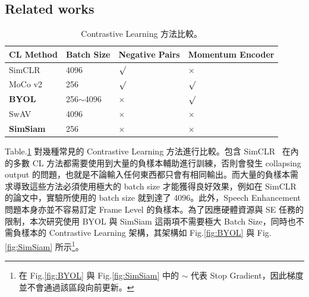 \documentclass[10pt,twocolumn,letterpaper]{article}
\begin{document}
\begin{CJK}{UTF8}{bkai}
   \section{Related works}
   \begin{table}
      \caption{Contrastive Learning 方法比較。\label{table:CL-methods}}
      \begin{center}
         \begin{tabular}{ m{1.7cm} m{1.7cm} m{1.7cm} m{1.7cm} }
            CL Method        & Batch Size    & Negative Pairs     & Momentum Encoder \\
            \hline
            SimCLR           & 4096          & $\surd$            & $\times$         \\
            \hline
            MoCo v2          & 256           & $\surd$            & $\surd$          \\
            \hline
            \textbf{BYOL}    & 256$\sim$4096 & \textbf{$\times$}  & $\surd$          \\
            \hline
            SwAV             & 4096          & $\times$           & $\times$         \\
            \hline
            \textbf{SimSiam} & 256           & \textbf{$\times$ } & $\times$         \\
            \hline
         \end{tabular}
      \end{center}
   \end{table}
   Table.\ref{table:CL-methods} 對幾種常見的 Contrastive Learning 方法進行比較。包含 SimCLR~\cite{SimCLR} 在內的多數
   CL 方法都需要使用到大量的負樣本輔助進行訓練，否則會發生 collapsing output
   的問題，也就是不論輸入任何東西都只會有相同輸出。而大量的負樣本需求導致這些方法必須使用極大的 batch size 才能獲得良好效果，例如在
   SimCLR 的論文中，實驗所使用的 batch size 就到達了 4096。此外，Speech Enhancement 問題本身亦並不容易訂定 Frame Level
   的負樣本。為了因應硬體資源與 SE 任務的限制，本次研究使用 BYOL\cite{BYOL} 與 SimSiam\cite{SimSiam} 這兩項不需要極大 Batch Size，同時也不需負樣本的
   Contrastive Learning 架構，其架構如 Fig.\ref{fig:BYOL} 與 Fig.\ref{fig:SimSiam} 所示\footnote{在
      Fig.\ref{fig:BYOL} 與 Fig.\ref{fig:SimSiam} 中的 $\sim$ 代表 Stop Gradient，因此梯度並不會通過該區段向前更新。}。


\end{CJK}
\end{document}
